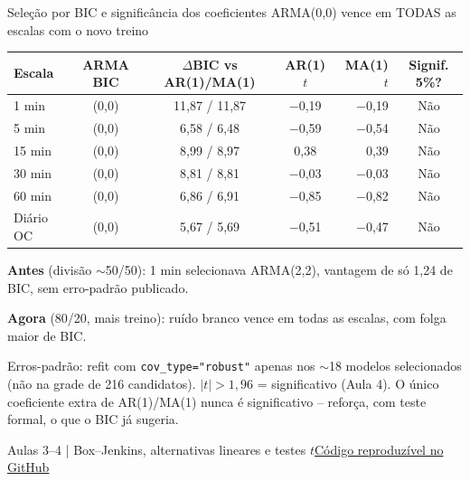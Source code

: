 \documentclass[aspectratio=169,10pt]{beamer}
\newcommand{\source}[2]{\par\vfill{\raggedright\tiny\color{muted}#1\quad\href{#2}{Código reproduzível no GitHub}\par}}
\newcommand{\tagline}[1]{{\small\color{teal}#1}\par\medskip}
\begin{document}
\begin{frame}[t]{Seleção por BIC e significância dos coeficientes}
\tagline{ARMA(0,0) vence em TODAS as escalas com o novo treino}
\centering\small\setlength{\tabcolsep}{4pt}\begin{tabular}{lcccrc}
\toprule
Escala & ARMA BIC & $\Delta$BIC vs AR(1)/MA(1) & AR(1) $t$ & MA(1) $t$ & Signif. 5\%? \\ \midrule
1 min & (0,0) & 11,87 / 11,87 & $-$0,19 & $-$0,19 & Não \\
5 min & (0,0) & 6,58 / 6,48 & $-$0,59 & $-$0,54 & Não \\
15 min & (0,0) & 8,99 / 8,97 & 0,38 & 0,39 & Não \\
30 min & (0,0) & 8,81 / 8,81 & $-$0,03 & $-$0,03 & Não \\
60 min & (0,0) & 6,86 / 6,91 & $-$0,85 & $-$0,82 & Não \\
Diário OC & (0,0) & 5,67 / 5,69 & $-$0,51 & $-$0,47 & Não \\
\bottomrule
\end{tabular}\par
\raggedright\medskip\small\textbf{Antes} (divisão $\sim$50/50): 1 min selecionava ARMA(2,2), vantagem de só 1,24 de BIC, sem erro-padrão publicado.\par
\textbf{Agora} (80/20, mais treino): \alert{ruído branco vence em todas as escalas}, com folga maior de BIC.\par\smallskip
\scriptsize Erros-padrão: refit com \texttt{cov\_type="robust"} apenas nos $\sim$18 modelos selecionados (não na grade de 216 candidatos). $|t|>1{,}96$ = significativo (Aula 4). O único coeficiente extra de AR(1)/MA(1) nunca é significativo -- reforça, com teste formal, o que o BIC já sugeria.
\source{Aulas 3--4 | Box--Jenkins, alternativas lineares e testes $t$}{https://github.com/avilarenan/EAD6034/blob/main/src/ead6034/annual_models.py}
\end{frame}
\end{document}
